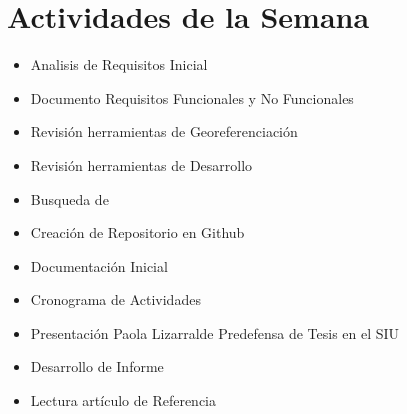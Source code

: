 \section{Actividades de la Semana}


\begin{itemize}

\item Analisis de Requisitos Inicial

\item Documento Requisitos Funcionales y No Funcionales

\item Revisión herramientas de Georeferenciación

\item Revisión herramientas de Desarrollo 

\item Busqueda de 

\item Creación de Repositorio en Github

\item Documentación Inicial

\item Cronograma de Actividades

\item Presentación Paola Lizarralde Predefensa de Tesis en el SIU

\item Desarrollo de Informe

\item Lectura artículo de Referencia\cite{scavuzzoalgoritmos}

\end{itemize}
